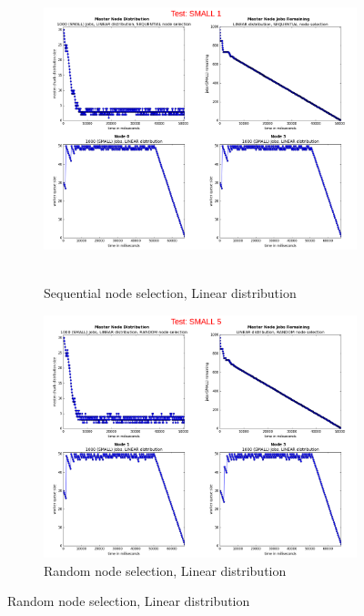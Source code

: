 \documentclass{article}
\begin{document}
\begin{figure}[p] 
  \begin{subfigure}[b]{0.5\linewidth}
    \centering
    \hbox{\hspace{-5.0em} \includegraphics[width=1.2\linewidth]{combined_small_overview/case_small_1} }
    \caption{Sequential node selection, Linear distribution}
    \label{testSmall1} 
    \vspace{4ex}
  \end{subfigure}%
  \begin{subfigure}[b]{0.5\linewidth}
    \centering
    \includegraphics[width=1.2\linewidth]{combined_small_overview/case_small_5} 
    \caption{Random node selection, Linear distribution} 
    \label{testSmall5} 
    \vspace{4ex}
  \end{subfigure} 
  

\end{figure}
\end{document}
